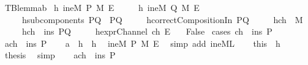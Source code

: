 \begin{isabellebody}
\endisatagproof
{\isafoldproof}%
%
\isadelimproof
\isanewline
%
\endisadelimproof
\isanewline
{}\isamarkupfalse%
\ TBlemma{}b{\isacharcolon}\isanewline
{}\ h{}{\isacharcolon}{\isachardoublequoteopen}{\isasymnot}\ {\isacharparenleft}ineM\ P\ M\ E{\isacharparenright}{\isachardoublequoteclose}\isanewline
\ \ \ \ \ h{}{\isacharcolon}{\isachardoublequoteopen}{\isasymnot}\ {\isacharparenleft}ineM\ Q\ M\ E{\isacharparenright}{\isachardoublequoteclose}\isanewline
\ \ \ \ \ h{}{\isacharcolon}{\isachardoublequoteopen}subcomponents\ PQ\ {\isacharequal}\ {\isacharbraceleft}P{\isacharcomma}Q{\isacharbraceright}{\isachardoublequoteclose}\isanewline
\ \ \ \ \ h{}{\isacharcolon}{\isachardoublequoteopen}correctCompositionIn\ PQ{\isachardoublequoteclose}\isanewline
\ \ \ \ \ h{}{\isacharcolon}{\isachardoublequoteopen}ch\ {\isasymin}\ M{\isachardoublequoteclose}\ \isanewline
\ \ \ \ \ h{}{\isacharcolon}{\isachardoublequoteopen}ch\ {\isasymin}\ ins\ PQ{\isachardoublequoteclose}\isanewline
\ \ \ \ \ h{}{\isacharcolon}{\isachardoublequoteopen}exprChannel\ ch\ E{\isachardoublequoteclose}\isanewline
\ \ \ {\isachardoublequoteopen}False{\isachardoublequoteclose}\isanewline
%
\isadelimproof
%
\endisadelimproof
%
\isatagproof
{}\isamarkupfalse%
\ {\isacharparenleft}cases\ {\isachardoublequoteopen}ch\ {\isasymin}\ ins\ P{\isachardoublequoteclose}{\isacharparenright}\isanewline
\ \ \isamarkupfalse%
\ a{}{\isacharcolon}{\isachardoublequoteopen}ch\ {\isasymin}\ ins\ P{\isachardoublequoteclose}\isanewline
\ \ \isamarkupfalse%
\ a{}\ \ h{}\ \ h{}\ \isamarkupfalse%
\ {\isachardoublequoteopen}ineM\ P\ M\ E{\isachardoublequoteclose}\ \isamarkupfalse%
\ {\isacharparenleft}simp\ add{\isacharcolon}\ ineM{\isacharunderscore}L{}{\isacharparenright}\isanewline
\ \ \isamarkupfalse%
\ this\ \ h{}\ \isamarkupfalse%
\ {\isacharquery}thesis\ \isamarkupfalse%
\ simp\isanewline
{}\isamarkupfalse%
\isanewline
\ \ \isamarkupfalse%
\ a{}{\isacharcolon}{\isachardoublequoteopen}ch\ {\isasymnotin}\ ins\ P{\isachardoublequoteclose}\ \isanewline
\ \ \isamarkupfalse%

\end{isabellebody}
